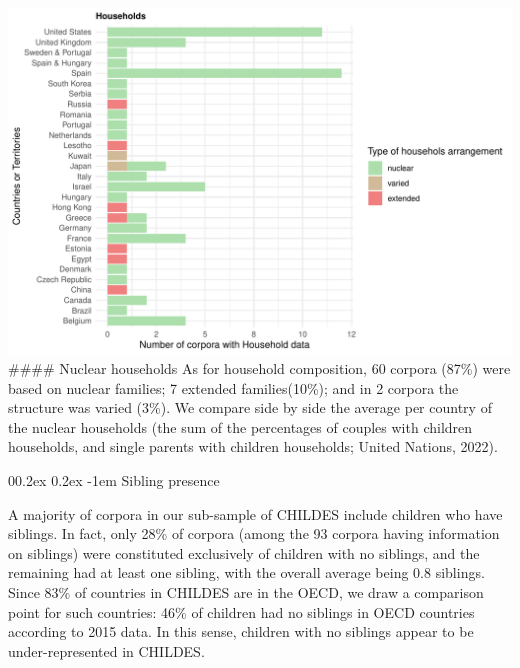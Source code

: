 \documentclass[
  man,floatsintext]{apa6}
\makeatletter
\let\oldparagraph\paragraph
\renewcommand{\paragraph}[1]{\oldparagraph{#1}\mbox{}}
\renewcommand{\paragraph}{\@startsection{paragraph}{4}{\parindent}%
  {0\baselineskip \@plus 0.2ex \@minus 0.2ex}%
  {-1em}%
  {\normalfont\normalsize\bfseries\itshape\typesectitle}}
\makeatother
\begin{document}
\includegraphics{CHILDES_short_files/figure-latex/figure5-1.pdf}
\#\#\#\# Nuclear households
As for household composition, 60 corpora (87\%) were based on nuclear families; 7 extended families(10\%); and in 2 corpora the structure was varied (3\%). We compare side by side the average per country of the nuclear households (the sum of the percentages of couples with children households, and single parents with children households; United Nations, 2022).

\hypertarget{sibling-presence}{%
\paragraph{Sibling presence}\label{sibling-presence}}

A majority of corpora in our sub-sample of CHILDES include children who have siblings. In fact, only 28\% of corpora (among the 93 corpora having information on siblings) were constituted exclusively of children with no siblings, and the remaining had at least one sibling, with the overall average being 0.8 siblings. Since 83\% of countries in CHILDES are in the OECD, we draw a comparison point for such countries: 46\% of children had no siblings in OECD countries according to 2015 data. In this sense, children with no siblings appear to be under-represented in CHILDES.
\end{document}
